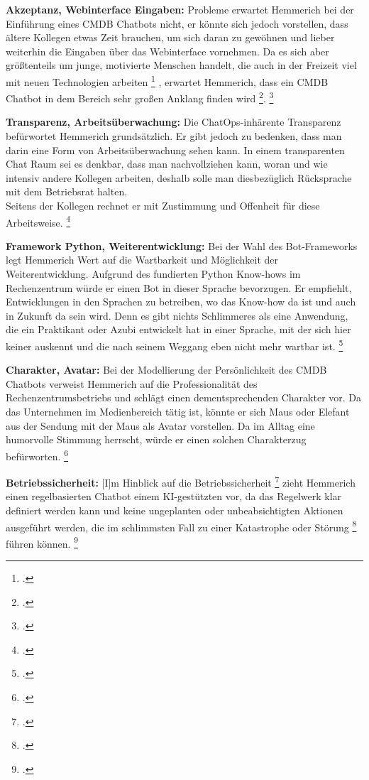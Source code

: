 \textbf{Akzeptanz, Webinterface Eingaben: }Probleme erwartet Hemmerich bei der Einführung eines \acs{CMDB} Chatbots nicht, er könnte sich jedoch vorstellen, dass ältere Kollegen etwas Zeit brauchen, um sich daran zu gewöhnen und lieber weiterhin die Eingaben über das Webinterface vornehmen. 
Da es sich aber größtenteils um junge, motivierte Menschen handelt, \glqq{}die auch in der Freizeit viel mit neuen Technologien arbeiten\grqq
\footcite[][o. \pno]{Hemm_2019}
, erwartet Hemmerich, dass ein \acs{CMDB} Chatbot \glqq{}in dem Bereich sehr großen Anklang finden wird\grqq
\footcite[][o. \pno]{Hemm_2019}{}.
\footcite[Vgl.][o. \pno]{Hemm_2019}

\textbf{Transparenz, Arbeitsüberwachung: }Die ChatOps-inhärente Transparenz befürwortet Hemmerich grundsätzlich. Er gibt jedoch zu bedenken, dass man darin eine Form von Arbeitsüberwachung sehen kann. In einem transparenten Chat Raum sei es denkbar, dass man nachvollziehen kann, woran und wie intensiv andere Kollegen arbeiten, deshalb solle man diesbezüglich Rücksprache mit dem Betriebsrat halten.\\
Seitens der Kollegen rechnet er mit Zustimmung und Offenheit für diese Arbeitsweise. 
\footcite[Vgl.][o. \pno]{Hemm_2019}

\textbf{Framework Python, Weiterentwicklung: }Bei der Wahl des Bot-Frameworks legt Hemmerich Wert auf die Wartbarkeit und Möglichkeit der Weiterentwicklung. Aufgrund des fundierten Python Know-hows im Rechenzentrum würde er einen Bot in dieser Sprache bevorzugen. Er empfiehlt, \glqq{}Entwicklungen in den Sprachen zu betreiben, wo das Know-how da ist und auch in Zukunft da sein wird. Denn es gibt nichts Schlimmeres als eine Anwendung, die ein Praktikant oder Azubi entwickelt hat in einer Sprache, mit der sich hier keiner auskennt und die nach seinem Weggang eben nicht mehr wartbar ist.\grqq
\footcites[][o. \pno]{Hemm_2019}[Vgl.][o. \pno]{Hemm_2019}

\textbf{Charakter, Avatar: }Bei der Modellierung der Persönlichkeit des \acs{CMDB} Chatbots verweist Hemmerich auf die Professionalität des Rechenzentrumsbetriebs und schlägt einen dementsprechenden Charakter vor. Da das Unternehmen im Medienbereich tätig ist, könnte er sich Maus oder Elefant aus der Sendung mit der Maus als Avatar vorstellen. Da im Alltag eine humorvolle Stimmung herrscht, würde er einen solchen Charakterzug befürworten.  
\footcite[Vgl.][o. \pno]{Hemm_2019}

\textbf{Betriebssicherheit: }\glqq{}[I]m Hinblick auf die Betriebssicherheit\grqq
\footcite[][o. \pno]{Hemm_2019}
zieht Hemmerich einen regelbasierten Chatbot einem KI-gestützten vor, da das Regelwerk klar definiert werden kann und keine ungeplanten oder unbeabsichtigten Aktionen ausgeführt werden, die im schlimmsten Fall zu \glqq{}einer Katastrophe oder Störung\grqq 
\footcite[][o. \pno]{Hemm_2019}
 führen können. 
\footcite[Vgl.][o. \pno]{Hemm_2019}

